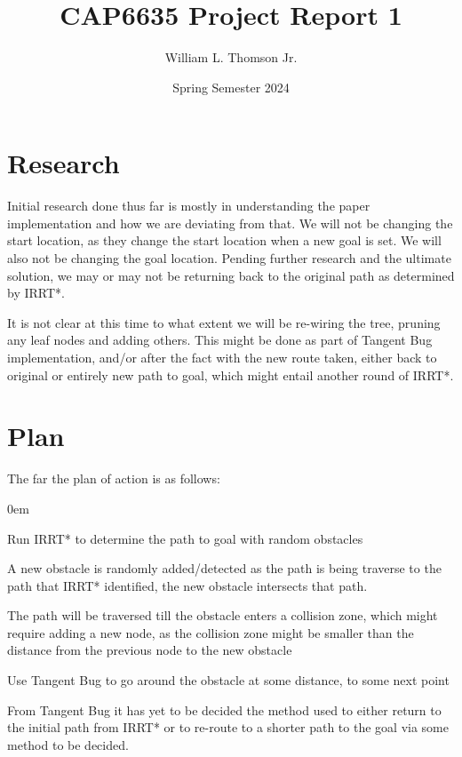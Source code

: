 \documentclass[12pt]{article}
\title{\textbf{CAP6635 Project Report 1}}
\author{William L. Thomson Jr.}
\date{Spring Semester 2024}
\begin{document}
\maketitle
\thispagestyle{empty}

\section{Research}
\indent \indent Initial research done thus far is mostly in understanding the paper implementation and
how we are deviating from that. We will not be changing the start location, as they change the start location when a new goal is set. We will also not be changing the goal location.
Pending further research and the ultimate solution, we may or may not be returning back
to the original path as determined by IRRT*.

It is not clear at this time to what extent we will be re-wiring the tree, pruning any leaf
nodes and adding others. This might be done as part of Tangent Bug implementation, and/or
after the fact with the new route taken, either back to original or entirely new path to 
goal, which might entail another round of IRRT*.

\section{Plan}
The far the plan of action is as follows:
\begin{description}[style=multiline,leftmargin=8em]
\itemsep0em
\item[IRRT*] Run IRRT* to determine the path to goal with random obstacles
\item[New Obstacle] A new obstacle is randomly added/detected as the path is being traverse
					to the path that IRRT* identified, the new obstacle intersects that path.
\item[Collision Zone] The path will be traversed till the obstacle enters a collision zone,
                      which might require adding a new node, as the collision zone might
                      be smaller than the distance from the previous node to the new obstacle
\item[Tangent Bug] Use Tangent Bug to go around the obstacle at some distance, to some next point
\item[To Be Decided] From Tangent Bug it has yet to be decided the method used to either return
					 to the initial path from IRRT* or to re-route to a shorter path to the goal
					 via some method to be decided.
\end{description}
\end{document}
